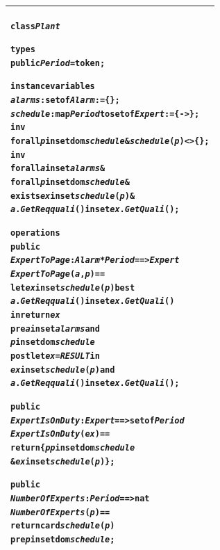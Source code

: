 \documentclass[\pformat,12pt,twoside]{article}
\newenvironment{VDMgray}%
{\begin{tabular}{|G|}\hline\small\begin{alltt}}%
{\end{alltt}\normalsize\\
 \hline\end{tabular}}
\begin{document}
\begin{VDMgray}
\textbf{class} \textit{Plant}

\textbf{types}
 \textbf{public} \textit{Period} = \textbf{token};

\textbf{instance} \textbf{variables}
 \textit{alarms} : \textbf{set} \textbf{of} \textit{Alarm} := \{\};
 \textit{schedule} : \textbf{map} \textit{Period} \textbf{to} \textbf{set} \textbf{of} \textit{Expert} := \{{\textbar}-\texttt{>}\};
 \textbf{inv}
   \textbf{forall} \textit{p} \textbf{in set} \textbf{dom} \textit{schedule} \& \textit{schedule}(\textit{p}) \texttt{<}\texttt{>} \{\};
 \textbf{inv}
   \textbf{forall} \textit{a} \textbf{in set} \textit{alarms} \&
      \textbf{forall} \textit{p} \textbf{in set} \textbf{dom} \textit{schedule} \&
         \textbf{exists} \textit{ex} \textbf{in set} \textit{schedule}(\textit{p}) \&
            \textit{a}.\textit{GetReqquali}() \textbf{in set} \textit{ex}.\textit{GetQuali}();

\textbf{operations}
 \textbf{public}
 \textit{ExpertToPage} : \textit{Alarm} * \textit{Period} ==\texttt{>} \textit{Expert}
 \textit{ExpertToPage}(\textit{a}, \textit{p}) ==
   \textbf{let} \textit{ex} \textbf{in set} \textit{schedule}(\textit{p}) \textbf{be} \textbf{st}
       \textit{a}.\textit{GetReqquali}() \textbf{in set} \textit{ex}.\textit{GetQuali}()
   \textbf{in} \textbf{return} \textit{ex}
 \textbf{pre} \textit{a} \textbf{in set} \textit{alarms} \textbf{and}
     \textit{p} \textbf{in set} \textbf{dom} \textit{schedule}
 \textbf{post} \textbf{let} \textit{ex} = \textit{RESULT} \textbf{in}
       \textit{ex} \textbf{in set} \textit{schedule}(\textit{p}) \textbf{and}
       \textit{a}.\textit{GetReqquali}() \textbf{in set} \textit{ex}.\textit{GetQuali}();

 \textbf{public}
 \textit{ExpertIsOnDuty} : \textit{Expert} ==\texttt{>} \textbf{set} \textbf{of} \textit{Period}
 \textit{ExpertIsOnDuty}(\textit{ex}) ==
   \textbf{return} \{\textit{p} {\textbar} \textit{p} \textbf{in set} \textbf{dom} \textit{schedule} 
             \& \textit{ex} \textbf{in set} \textit{schedule}(\textit{p})\};

 \textbf{public}
 \textit{NumberOfExperts} : \textit{Period} ==\texttt{>} \textbf{nat}
 \textit{NumberOfExperts}(\textit{p}) ==
  {\color{color6} \textbf{return}} {\color{color6} \textbf{card}} {\color{color6} \textit{schedule}}{\color{color6} (}{\color{color6} \textit{p}}{\color{color6} )
} \textbf{pre} {\color{color6} \textit{p}} {\color{color6} \textbf{in set}} {\color{color6} \textbf{dom}} {\color{color6} \textit{schedule}};
\end{VDMgray}
\end{document}
